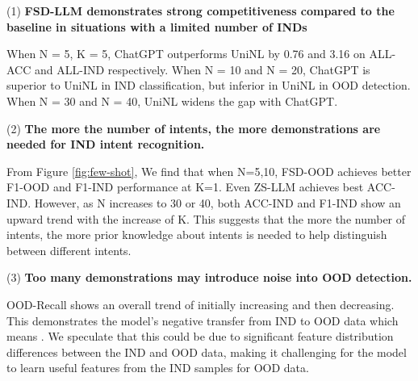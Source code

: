 \documentclass[10pt, a4paper]{article}
\begin{document}
(1) \textbf{FSD-LLM demonstrates strong competitiveness compared to the baseline in situations with a limited number of INDs} 

When N = 5, K = 5, ChatGPT outperforms UniNL by 0.76 and 3.16 on ALL-ACC and ALL-IND respectively. When N = 10 and N = 20, ChatGPT is superior to UniNL in IND classification, but inferior in UniNL in OOD detection. When N = 30 and N = 40, UniNL widens the gap with ChatGPT.

(2) \textbf{The more the number of intents, the more demonstrations are needed for IND intent recognition.}

From Figure \ref{fig:few-shot}, We find that when N=5,10, FSD-OOD achieves better F1-OOD and F1-IND performance at K=1. Even ZS-LLM achieves best ACC-IND. However, as N increases to 30 or 40, both ACC-IND and F1-IND show an upward trend with the increase of K. This suggests that the more the number of intents, the more prior knowledge about intents is needed to help distinguish between different intents. 

(3) \textbf{Too many demonstrations may introduce noise into OOD detection.}

OOD-Recall shows an overall trend of initially increasing and then decreasing. This demonstrates the model's negative transfer from IND to OOD data which means . We speculate that this could be due to significant feature distribution differences between the IND and OOD data, making it challenging for the model to learn useful features from the IND samples for OOD data.
\end{document}

